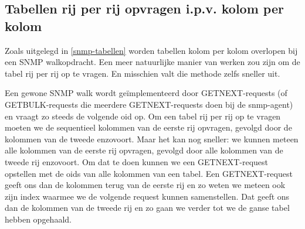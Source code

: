 
\subsection{Tabellen rij per rij opvragen i.p.v. kolom per kolom}
\label{rij-per-rij}

Zoals uitgelegd in \cref{snmp-tabellen} worden tabellen kolom per kolom overlopen bij een SNMP walkopdracht.
Een meer natuurlijke manier van werken zou zijn om de tabel rij per rij op te vragen.
En misschien valt die methode zelfs sneller uit.

Een gewone SNMP walk wordt geïmplementeerd door GETNEXT-requests (of GETBULK-requests die meerdere GETNEXT-requests doen bij de \gls{snmp-agent})
en vraagt zo steeds de volgende \gls{oid} op.
Om een tabel rij per rij op te vragen moeten we de sequentieel kolommen van de eerste rij opvragen, gevolgd door de kolommen van de tweede enzovoort.
Maar het kan nog sneller: we kunnen meteen alle kolommen van de eerste rij opvragen, gevolgd door alle kolommen van de tweede rij enzovoort.
Om dat te doen kunnen we een GETNEXT-request opstellen met de \glspl{oid} van alle kolommen van een tabel.
Een GETNEXT-request geeft ons dan de kolommen terug van de eerste rij en zo weten we meteen ook zijn index waarmee we de volgende request kunnen samenstellen.
Dat geeft ons dan de kolommen van de tweede rij en zo gaan we verder tot we de ganse tabel hebben opgehaald.

